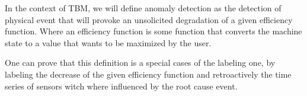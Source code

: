 \documentclass[../intro.tex]{subfiles}
\begin{document}
In the context of TBM, we will define anomaly detection as the detection
of physical event that will provoke an unsolicited degradation of a given
efficiency function. Where an efficiency function is some function that converts
the machine state to a value that wants to be maximized by the user.

One can prove that this definition is a special cases of the labeling one,
by labeling the decrease of the given efficiency function and retroactively
the time series of sensors witch where influenced by the root cause event.
\end{document}

